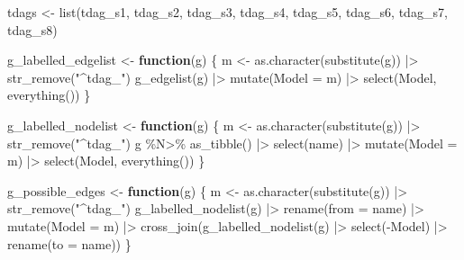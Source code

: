 \documentclass[
  letterpaper,
  DIV=11,
  numbers=noendperiod]{scrartcl}
\newenvironment{Shaded}{\begin{snugshade}}{\end{snugshade}}
\newcommand{\AttributeTok}[1]{\textcolor[rgb]{0.40,0.45,0.13}{#1}}
\newcommand{\ControlFlowTok}[1]{\textcolor[rgb]{0.00,0.23,0.31}{\textbf{#1}}}
\newcommand{\FunctionTok}[1]{\textcolor[rgb]{0.28,0.35,0.67}{#1}}
\newcommand{\NormalTok}[1]{\textcolor[rgb]{0.00,0.23,0.31}{#1}}
\newcommand{\OtherTok}[1]{\textcolor[rgb]{0.00,0.23,0.31}{#1}}
\newcommand{\SpecialCharTok}[1]{\textcolor[rgb]{0.37,0.37,0.37}{#1}}
\newcommand{\StringTok}[1]{\textcolor[rgb]{0.13,0.47,0.30}{#1}}
\begin{document}
\begin{Shaded}
\begin{Highlighting}[]
\NormalTok{tdags }\OtherTok{\textless{}{-}} \FunctionTok{list}\NormalTok{(tdag\_s1, tdag\_s2, tdag\_s3, tdag\_s4,}
\NormalTok{              tdag\_s5, tdag\_s6, tdag\_s7, tdag\_s8)}

\NormalTok{g\_labelled\_edgelist }\OtherTok{\textless{}{-}} \ControlFlowTok{function}\NormalTok{(g) \{}
\NormalTok{    m }\OtherTok{\textless{}{-}} \FunctionTok{as.character}\NormalTok{(}\FunctionTok{substitute}\NormalTok{(g)) }\SpecialCharTok{|\textgreater{}} 
        \FunctionTok{str\_remove}\NormalTok{(}\StringTok{"\^{}tdag\_"}\NormalTok{)}
    \FunctionTok{g\_edgelist}\NormalTok{(g) }\SpecialCharTok{|\textgreater{}} 
        \FunctionTok{mutate}\NormalTok{(}\AttributeTok{Model =}\NormalTok{ m) }\SpecialCharTok{|\textgreater{}} 
        \FunctionTok{select}\NormalTok{(Model, }\FunctionTok{everything}\NormalTok{())}
\NormalTok{\}}

\NormalTok{g\_labelled\_nodelist }\OtherTok{\textless{}{-}} \ControlFlowTok{function}\NormalTok{(g) \{}
\NormalTok{    m }\OtherTok{\textless{}{-}} \FunctionTok{as.character}\NormalTok{(}\FunctionTok{substitute}\NormalTok{(g)) }\SpecialCharTok{|\textgreater{}}  
        \FunctionTok{str\_remove}\NormalTok{(}\StringTok{"\^{}tdag\_"}\NormalTok{)}
\NormalTok{     g }\SpecialCharTok{\%N\textgreater{}\%}
         \FunctionTok{as\_tibble}\NormalTok{() }\SpecialCharTok{|\textgreater{}} 
         \FunctionTok{select}\NormalTok{(name) }\SpecialCharTok{|\textgreater{}} 
        \FunctionTok{mutate}\NormalTok{(}\AttributeTok{Model =}\NormalTok{ m) }\SpecialCharTok{|\textgreater{}} 
        \FunctionTok{select}\NormalTok{(Model, }\FunctionTok{everything}\NormalTok{())}
\NormalTok{\}}

\NormalTok{g\_possible\_edges }\OtherTok{\textless{}{-}} \ControlFlowTok{function}\NormalTok{(g) \{}
\NormalTok{    m }\OtherTok{\textless{}{-}} \FunctionTok{as.character}\NormalTok{(}\FunctionTok{substitute}\NormalTok{(g)) }\SpecialCharTok{|\textgreater{}}  
        \FunctionTok{str\_remove}\NormalTok{(}\StringTok{"\^{}tdag\_"}\NormalTok{)}
    \FunctionTok{g\_labelled\_nodelist}\NormalTok{(g) }\SpecialCharTok{|\textgreater{}} 
        \FunctionTok{rename}\NormalTok{(}\AttributeTok{from =}\NormalTok{ name) }\SpecialCharTok{|\textgreater{}} 
        \FunctionTok{mutate}\NormalTok{(}\AttributeTok{Model =}\NormalTok{ m) }\SpecialCharTok{|\textgreater{}} 
        \FunctionTok{cross\_join}\NormalTok{(}\FunctionTok{g\_labelled\_nodelist}\NormalTok{(g) }\SpecialCharTok{|\textgreater{}} 
                       \FunctionTok{select}\NormalTok{(}\SpecialCharTok{{-}}\NormalTok{Model) }\SpecialCharTok{|\textgreater{}} 
                       \FunctionTok{rename}\NormalTok{(}\AttributeTok{to =}\NormalTok{ name))}
\NormalTok{\}}


\end{Highlighting}
\end{Shaded}
\end{document}

